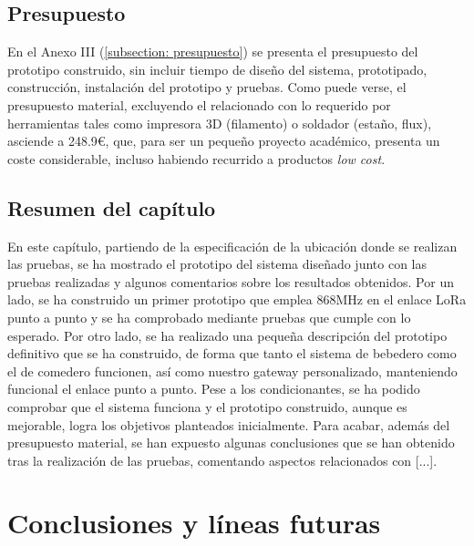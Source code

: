 \documentclass[12pt]{article}
\begin{document}
	\pagebreak
	
	\subsection[Presupuesto]{Presupuesto}

	\noindent En el Anexo III (\ref{subsection: presupuesto}) se presenta el presupuesto del prototipo construido, sin incluir tiempo de diseño del sistema, prototipado, construcción, instalación del prototipo y pruebas. Como puede verse, el presupuesto material, excluyendo el relacionado con lo requerido por herramientas tales como impresora 3D (filamento) o soldador (estaño, flux), asciende a 248.9\euro, que, para ser un pequeño proyecto académico, presenta un coste considerable, incluso habiendo recurrido a productos \textit{low cost}. \\
	
	\pagebreak
	
	\subsection[Resumen del capítulo]{Resumen del capítulo}
	
	\noindent En este capítulo, partiendo de la especificación de la ubicación donde se realizan las pruebas, se ha mostrado el prototipo del sistema diseñado junto con las pruebas realizadas y algunos comentarios sobre los resultados obtenidos. Por un lado, se ha construido un primer prototipo que emplea 868MHz en el enlace LoRa punto a punto y se ha comprobado mediante pruebas que cumple con lo esperado. Por otro lado, se ha realizado una pequeña descripción del prototipo definitivo que se ha construido, de forma que tanto el sistema de bebedero como el de comedero funcionen, así como nuestro gateway personalizado, manteniendo funcional el enlace punto a punto. Pese a los condicionantes, se ha podido comprobar que el sistema funciona y el prototipo construido, aunque es mejorable, logra los objetivos planteados inicialmente. Para acabar, además del presupuesto material,  se han expuesto algunas conclusiones que se han obtenido tras la realización de las pruebas, comentando aspectos relacionados con  [...]. \\
	
	\pagebreak
	
	\section[Conclusiones y líneas futuras]{Conclusiones y líneas futuras}
	
\end{document}
